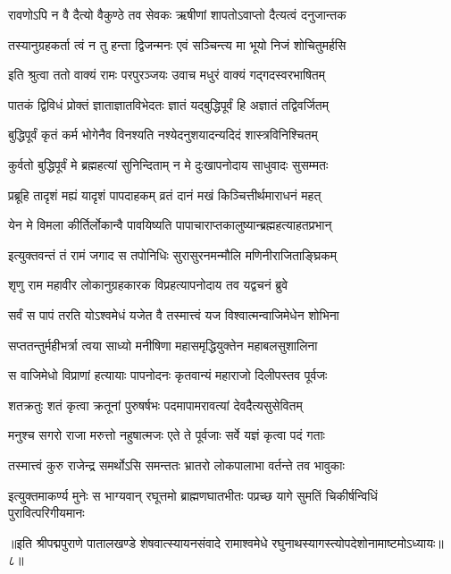 \twolineshloka
{रावणोऽपि न वै दैत्यो वैकुण्ठे तव सेवकः}
{ऋषीणां शापतोऽवाप्तो दैत्यत्वं दनुजान्तक}%

\twolineshloka
{तस्यानुग्रहकर्ता त्वं न तु हन्ता द्विजन्मनः}
{एवं सञ्चिन्त्य मा भूयो निजं शोचितुमर्हसि}%

\twolineshloka
{इति श्रुत्वा ततो वाक्यं रामः परपुरञ्जयः}
{उवाच मधुरं वाक्यं गद्गदस्वरभाषितम्}%


\twolineshloka
{पातकं द्विविधं प्रोक्तं ज्ञाताज्ञातविभेदतः}
{ज्ञातं यद्बुद्धिपूर्वं हि अज्ञातं तद्विवर्जितम्}%

\twolineshloka
{बुद्धिपूर्वं कृतं कर्म भोगेनैव विनश्यति}
{नश्येदनुशयादन्यदिदं शास्त्रविनिश्चितम्}%

\twolineshloka
{कुर्वतो बुद्धिपूर्वं मे ब्रह्महत्यां सुनिन्दिताम्}
{न मे दुःखापनोदाय साधुवादः सुसम्मतः}%

\twolineshloka
{प्रब्रूहि तादृशं मह्यं यादृशं पापदाहकम्}
{व्रतं दानं मखं किञ्चित्तीर्थमाराधनं महत्}%

\twolineshloka
{येन मे विमला कीर्तिर्लोकान्वै पावयिष्यति}
{पापाचाराप्तकालुष्यान्ब्रह्महत्याहतप्रभान्}%


\twolineshloka
{इत्युक्तवन्तं तं रामं जगाद स तपोनिधिः}
{सुरासुरनमन्मौलि मणिनीराजिताङ्घ्रिकम्}%

\twolineshloka
{शृणु राम महावीर लोकानुग्रहकारक}
{विप्रहत्यापनोदाय तव यद्वचनं ब्रुवे}%

\twolineshloka
{सर्वं स पापं तरति योऽश्वमेधं यजेत वै}
{तस्मात्त्वं यज विश्वात्मन्वाजिमेधेन शोभिना}%

\twolineshloka
{सप्ततन्तुर्महीभर्त्रा त्वया साध्यो मनीषिणा}
{महासमृद्धियुक्तेन महाबलसुशालिना}%

\twolineshloka
{स वाजिमेधो विप्राणां हत्यायाः पापनोदनः}
{कृतवान्यं महाराजो दिलीपस्तव पूर्वजः}%

\twolineshloka
{शतक्रतुः शतं कृत्वा क्रतूनां पुरुषर्षभः}
{पदमापामरावत्यां देवदैत्यसुसेवितम्}%

\twolineshloka
{मनुश्च सगरो राजा मरुत्तो नहुषात्मजः}
{एते ते पूर्वजाः सर्वे यज्ञं कृत्वा पदं गताः}%

\twolineshloka
{तस्मात्त्वं कुरु राजेन्द्र समर्थोऽसि समन्ततः}
{भ्रातरो लोकपालाभा वर्तन्ते तव भावुकाः}%

\twolineshloka
{इत्युक्तमाकर्ण्य मुनेः स भाग्यवान् रघूत्तमो ब्राह्मणघातभीतः}
{पप्रच्छ यागे सुमतिं चिकीर्षन्विधिं पुरावित्परिगीयमानः}%

{॥इति श्रीपद्मपुराणे पातालखण्डे शेषवात्स्यायनसंवादे रामाश्वमेधे रघुनाथस्यागस्त्योपदेशोनामाष्टमोऽध्यायः॥८॥}

